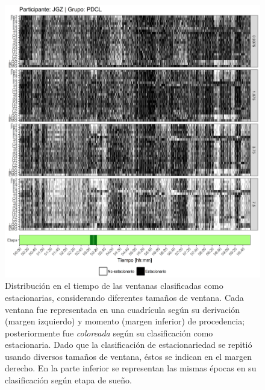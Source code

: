 \documentclass[12pt,letterpaper,draft]{book}
\begin{document}
\begin{figure}
\centering
\includegraphics[width=\linewidth]
{./scripts_graf_res/JGZ_patrones_1.png}
\caption[Distribución en el tiempo de las ventanas clasificadas como estacionarias, considerando diferentes tamaños de ventana]{Distribución en el tiempo de las ventanas clasificadas como estacionarias, considerando diferentes tamaños de ventana. 
Cada ventana fue representada en una cuadrícula según su derivación (margen izquierdo) y momento (margen inferior) de procedencia; posteriormente fue \textit{coloreada} según su clasificación como estacionaria.
Dado que la clasificación de estacionariedad se repitió usando diversos tamaños de ventana, éstos se indican en el margen derecho.
En la parte inferior se representan las mismas épocas en su clasificación según etapa de sueño.}
\end{figure}
\end{document}
